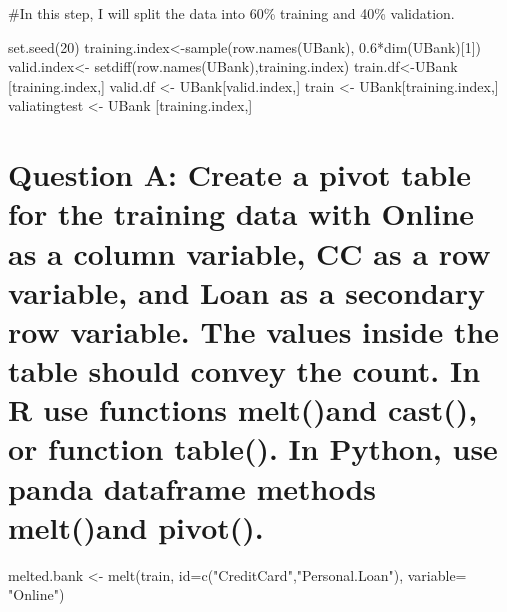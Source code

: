 \documentclass[
]{article}
\newenvironment{Shaded}{\begin{snugshade}}{\end{snugshade}}
\newcommand{\AttributeTok}[1]{\textcolor[rgb]{0.77,0.63,0.00}{#1}}
\newcommand{\DecValTok}[1]{\textcolor[rgb]{0.00,0.00,0.81}{#1}}
\newcommand{\FloatTok}[1]{\textcolor[rgb]{0.00,0.00,0.81}{#1}}
\newcommand{\FunctionTok}[1]{\textcolor[rgb]{0.00,0.00,0.00}{#1}}
\newcommand{\NormalTok}[1]{#1}
\newcommand{\OtherTok}[1]{\textcolor[rgb]{0.56,0.35,0.01}{#1}}
\newcommand{\SpecialCharTok}[1]{\textcolor[rgb]{0.00,0.00,0.00}{#1}}
\newcommand{\StringTok}[1]{\textcolor[rgb]{0.31,0.60,0.02}{#1}}
\begin{document}
\#In this step, I will split the data into 60\% training and 40\%
validation.

\begin{Shaded}
\begin{Highlighting}[]
\FunctionTok{set.seed}\NormalTok{(}\DecValTok{20}\NormalTok{)}
\NormalTok{training.index}\OtherTok{\textless{}{-}}\FunctionTok{sample}\NormalTok{(}\FunctionTok{row.names}\NormalTok{(UBank), }\FloatTok{0.6}\SpecialCharTok{*}\FunctionTok{dim}\NormalTok{(UBank)[}\DecValTok{1}\NormalTok{])}
\NormalTok{valid.index}\OtherTok{\textless{}{-}} \FunctionTok{setdiff}\NormalTok{(}\FunctionTok{row.names}\NormalTok{(UBank),training.index)}
\NormalTok{train.df}\OtherTok{\textless{}{-}}\NormalTok{UBank [training.index,]}
\NormalTok{valid.df }\OtherTok{\textless{}{-}}\NormalTok{ UBank[valid.index,]}
\NormalTok{train }\OtherTok{\textless{}{-}}\NormalTok{ UBank[training.index,]}
\NormalTok{valiatingtest }\OtherTok{\textless{}{-}}\NormalTok{ UBank [training.index,]}
\end{Highlighting}
\end{Shaded}

\hypertarget{question-a-create-a-pivot-table-for-the-training-data-with-online-as-a-column-variable-cc-as-a-row-variable-and-loan-as-a-secondary-row-variable.-the-values-inside-the-table-should-convey-the-count.-in-r-use-functions-meltand-cast-or-function-table.-in-python-use-panda-dataframe-methods-meltand-pivot.}{%
\section{Question A: Create a pivot table for the training data with
Online as a column variable, CC as a row variable, and Loan as a
secondary row variable. The values inside the table should convey the
count. In R use functions melt()and cast(), or function table(). In
Python, use panda dataframe methods melt()and
pivot().}\label{question-a-create-a-pivot-table-for-the-training-data-with-online-as-a-column-variable-cc-as-a-row-variable-and-loan-as-a-secondary-row-variable.-the-values-inside-the-table-should-convey-the-count.-in-r-use-functions-meltand-cast-or-function-table.-in-python-use-panda-dataframe-methods-meltand-pivot.}}

\begin{Shaded}
\begin{Highlighting}[]
\NormalTok{melted.bank }\OtherTok{\textless{}{-}} \FunctionTok{melt}\NormalTok{(train, }\AttributeTok{id=}\FunctionTok{c}\NormalTok{(}\StringTok{"CreditCard"}\NormalTok{,}\StringTok{"Personal.Loan"}\NormalTok{), }\AttributeTok{variable=} \StringTok{"Online"}\NormalTok{)}
\end{Highlighting}
\end{Shaded}
\end{document}
